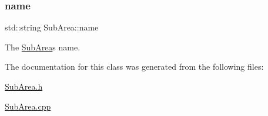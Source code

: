\subsubsection{\texorpdfstring{name}{name}}
{\footnotesize\ttfamily std\+::string Sub\+Area\+::name\hspace{0.3cm}{\ttfamily [private]}}



The \hyperlink{classSubArea}{Sub\+Area}\textquotesingle{}s name. 



The documentation for this class was generated from the following files\+:\begin{DoxyCompactItemize}
\item 
\hyperlink{SubArea_8h}{Sub\+Area.\+h}\item 
\hyperlink{SubArea_8cpp}{Sub\+Area.\+cpp}\end{DoxyCompactItemize}
